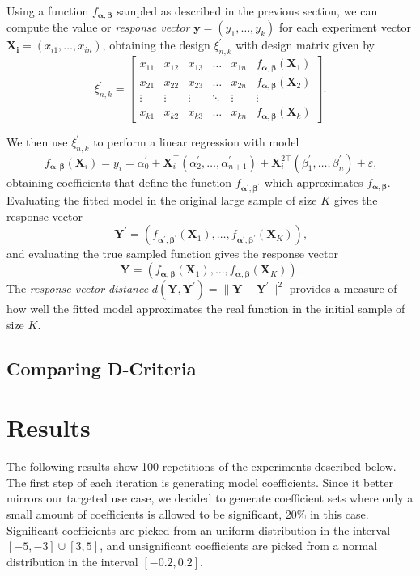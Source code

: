 \documentclass[11pt]{article}
\begin{document}
Using a function \(f_{\boldsymbol{\alpha},\boldsymbol{\beta}}\) sampled as
described in the previous section, we can compute the value or \emph{response vector}
\(\boldsymbol{y} = (y_1,\dots,y_k)\) for each experiment vector \(\boldsymbol{X_i}
= (x_{i1},\dots,x_{in})\), obtaining the design \(\xi^{\prime}_{n,k}\) with design
matrix given by
\[
\xi^{\prime}_{n,k} =
\begin{bmatrix}
    x_{11} & x_{12} & x_{13} & \dots  & x_{1n} & f_{\boldsymbol{\alpha},\boldsymbol{\beta}}(\boldsymbol{X}_1) \\
    x_{21} & x_{22} & x_{23} & \dots  & x_{2n} & f_{\boldsymbol{\alpha},\boldsymbol{\beta}}(\boldsymbol{X}_2)\\
    \vdots & \vdots & \vdots & \ddots & \vdots & \vdots \\
    x_{k1} & x_{k2} & x_{k3} & \dots  & x_{kn} & f_{\boldsymbol{\alpha},\boldsymbol{\beta}}(\boldsymbol{X}_k)
\end{bmatrix}.
\]

We then use \(\xi^{\prime}_{n,k}\) to perform a linear regression with model
\[
f_{\boldsymbol{\alpha},\boldsymbol{\beta}}(\boldsymbol{X}_i) = y_i = \alpha^{\prime}_0 +
\boldsymbol{X}_i^{\top}(\alpha^{\prime}_{2}, \dots, \alpha^{\prime}_{n + 1}) +
\boldsymbol{X}^{2\top}_i(\beta^{\prime}_{1}, \dots, \beta^{\prime}_{n}) +
\varepsilon\text{,}
\]
obtaining coefficients that define the function
\(f_{\boldsymbol{\alpha}^{\prime},\boldsymbol{\beta}^{\prime}}\) which
approximates \(f_{\boldsymbol{\alpha},\boldsymbol{\beta}}\).
Evaluating the fitted model in the original large sample of size \(K\) gives
the response vector
\[
\boldsymbol{Y}^{\prime} = (f_{\boldsymbol{\alpha}^{\prime},\boldsymbol{\beta}^{\prime}}
(\boldsymbol{X}_1), \dots, f_{\boldsymbol{\alpha}^{\prime},\boldsymbol{\beta}^{\prime}}
(\boldsymbol{X}_K))\text{,}
\]
and evaluating the true sampled function gives the response vector
\[
\boldsymbol{Y} = (f_{\boldsymbol{\alpha},\boldsymbol{\beta}}
(\boldsymbol{X}_1), \dots, f_{\boldsymbol{\alpha},\boldsymbol{\beta}}
(\boldsymbol{X}_K))\text{.}
\]
The \emph{response vector distance} \(d(\mathbf{Y}, \mathbf{Y}^{\prime}) =
\|\mathbf{Y} - \mathbf{Y}^{\prime}\|^{2}\) provides a measure of how well the
fitted model approximates the real function in the initial sample of size \(K\).
\subsection{Comparing D-Criteria}
\label{sec:orgba04456}
\section{Results}
\label{sec:orgeb37116}
The following results show 100 repetitions of the experiments described below.
The first step of each iteration is generating model coefficients. Since it
better mirrors our targeted use case, we decided to generate coefficient sets
where only a small amount of coefficients is allowed to be significant, 20\% in
this case. Significant coefficients are picked from an uniform distribution in
the interval \([-5, -3] \cup [3, 5]\), and unsignificant coefficients are picked
from a normal distribution in the interval \([-0.2, 0.2]\).
\end{document}
